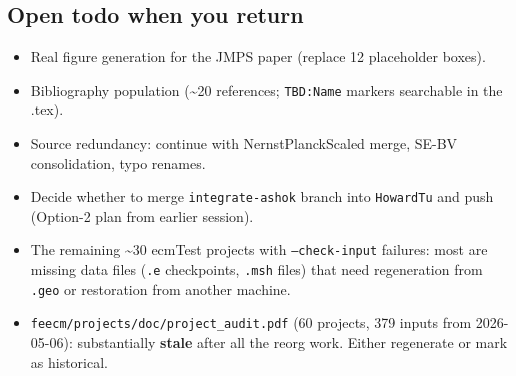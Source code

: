 \documentclass[11pt,letterpaper]{article}
\newenvironment{tightitemize}{\begin{itemize}\setlength\itemsep{0pt}\setlength\parsep{0pt}}{\end{itemize}}
\newcommand{\code}[1]{\texttt{\small #1}}
\begin{document}
\subsection{Open todo when you return}

\begin{tightitemize}
  \item Real figure generation for the JMPS paper (replace 12 placeholder boxes).
  \item Bibliography population (\textasciitilde{}20 references; \code{TBD:Name} markers searchable in the .tex).
  \item Source redundancy: continue with NernstPlanckScaled merge, SE-BV consolidation, typo renames.
  \item Decide whether to merge \code{integrate-ashok} branch into \code{HowardTu} and push (Option-2 plan from earlier session).
  \item The remaining \textasciitilde{}30 ecmTest projects with \code{--check-input} failures: most are missing data files (\code{.e} checkpoints, \code{.msh} files) that need regeneration from \code{.geo} or restoration from another machine.
  \item \code{feecm/projects/doc/project\_audit.pdf} (60 projects, 379 inputs from 2026-05-06): substantially \textbf{stale} after all the reorg work. Either regenerate or mark as historical.
\end{tightitemize}
\end{document}
